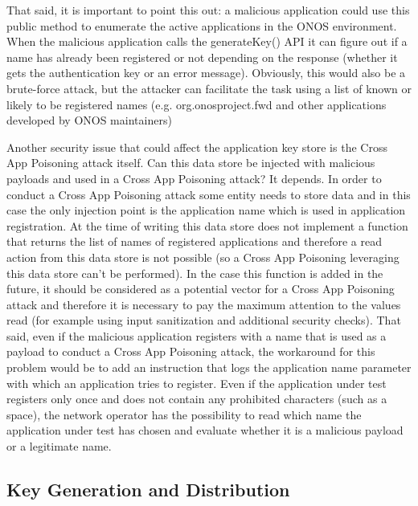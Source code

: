 \documentclass[a4paper,10pt]{memoir}
\begin{document}
That said, it is important to point this out: a malicious application could use this public method to enumerate the active applications in the ONOS environment. When the malicious application calls the generateKey() API it can figure out if a name has already been registered or not depending on the response (whether it gets the authentication key or an error message). Obviously, this would also be a brute-force attack, but the attacker can facilitate the task using a list of known or likely to be registered names (e.g. org.onosproject.fwd and other applications developed by ONOS maintainers)
\medskip

Another security issue that could affect the application key store is the Cross App Poisoning attack itself. Can this data store be injected with malicious payloads and used in a Cross App Poisoning attack? It depends. In order to conduct a Cross App Poisoning attack some entity needs to store data and in this case the only injection point is the application name which is used in application registration. At the time of writing this data store does not implement a function that returns the list of names of registered applications and therefore a read action from this data store is not possible (so a Cross App Poisoning leveraging this data store can't be performed). In the case this function is added in the future, it should be considered as a potential vector for a Cross App Poisoning attack and therefore it is necessary to pay the maximum attention to the values read (for example using input sanitization and additional security checks). That said, even if the malicious application registers with a name that is used as a payload to conduct a Cross App Poisoning attack, the workaround for this problem would be to add an instruction that logs the application name parameter with which an application tries to register. Even if the application under test registers only once and does not contain any prohibited characters (such as a space), the network operator has the possibility to read which name the application under test has chosen and evaluate whether it is a malicious payload or a legitimate name.

\subsection{Key Generation and Distribution}
\end{document}
